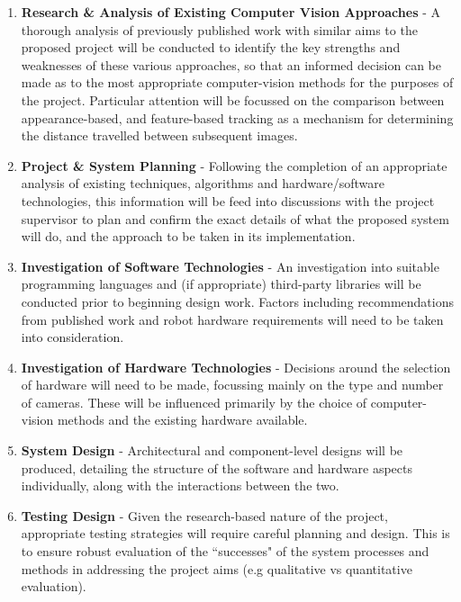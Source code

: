 \documentclass[10pt,fleqn,twoside]{article}
\begin{document}
\begin{enumerate}
	\item \textbf{Research \& Analysis of Existing Computer Vision Approaches} -  A thorough analysis of previously published work with similar aims to the proposed project will be conducted to identify the key strengths and weaknesses of these various approaches, so that an informed decision can be made as to the most appropriate computer-vision methods for the purposes of the project. Particular attention will be focussed on the comparison between appearance-based, and feature-based tracking as a mechanism for determining the distance travelled between subsequent images. 
	
	\item \textbf{Project \& System Planning} - Following the completion of an appropriate analysis of existing techniques, algorithms and hardware/software technologies, this information will be feed into discussions with the project supervisor to plan and confirm the exact details of what the proposed system will do, and the approach to be taken in its implementation.

	\item \textbf{Investigation of Software Technologies} - An investigation into suitable programming languages and (if appropriate) third-party libraries will be conducted prior to beginning design work. Factors including recommendations from published work and robot hardware requirements will need to be taken into consideration.
	
	\item \textbf{Investigation of Hardware Technologies} - Decisions around the selection of hardware will need to be made, focussing mainly on the type and number of cameras. These will be influenced primarily by the choice of computer-vision methods and the existing hardware available.

	\item \textbf{System Design} - Architectural and component-level designs will be produced, detailing the structure of the software and hardware aspects individually, along with the interactions between the two.
	
	\item \textbf{Testing Design} - Given the research-based nature of the project, appropriate testing strategies will require careful planning and design. This is to ensure robust evaluation of the ``successes" of the system processes and methods in addressing the project aims (e.g qualitative vs quantitative evaluation).
	

\end{enumerate}
\end{document}
